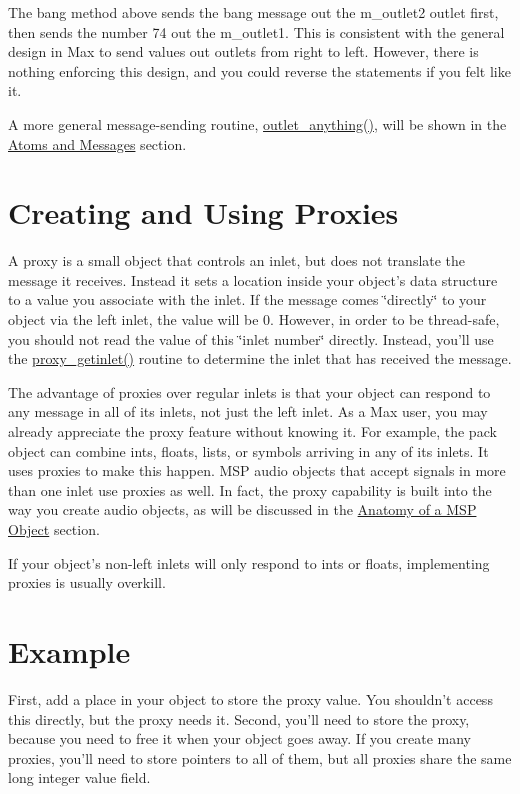 The bang method above sends the bang message out the m\_\-outlet2 outlet first, then sends the number 74 out the m\_\-outlet1. This is consistent with the general design in Max to send values out outlets from right to left. However, there is nothing enforcing this design, and you could reverse the statements if you felt like it.

A more general message-\/sending routine, \hyperlink{group__inout_ga12798ee897e01dac21ee547c4091d8a8}{outlet\_\-anything()}, will be shown in the \hyperlink{chapter_atoms}{Atoms and Messages} section.\hypertarget{chapter_inout_chapter_inout_proxies}{}\section{Creating and Using Proxies}\label{chapter_inout_chapter_inout_proxies}
A proxy is a small object that controls an inlet, but does not translate the message it receives. Instead it sets a location inside your object's data structure to a value you associate with the inlet. If the message comes \char`\"{}directly\char`\"{} to your object via the left inlet, the value will be 0. However, in order to be thread-\/safe, you should not read the value of this \char`\"{}inlet number\char`\"{} directly. Instead, you'll use the \hyperlink{group__inout_gae81f89a78389587dc23d641e38b42481}{proxy\_\-getinlet()} routine to determine the inlet that has received the message.

The advantage of proxies over regular inlets is that your object can respond to any message in all of its inlets, not just the left inlet. As a Max user, you may already appreciate the proxy feature without knowing it. For example, the pack object can combine ints, floats, lists, or symbols arriving in any of its inlets. It uses proxies to make this happen. MSP audio objects that accept signals in more than one inlet use proxies as well. In fact, the proxy capability is built into the way you create audio objects, as will be discussed in the \hyperlink{chapter_msp_anatomy}{Anatomy of a MSP Object} section.

If your object's non-\/left inlets will only respond to ints or floats, implementing proxies is usually overkill.\hypertarget{chapter_inout_chapter_inout_example}{}\section{Example}\label{chapter_inout_chapter_inout_example}
First, add a place in your object to store the proxy value. You shouldn't access this directly, but the proxy needs it. Second, you'll need to store the proxy, because you need to free it when your object goes away. If you create many proxies, you'll need to store pointers to all of them, but all proxies share the same long integer value field.


